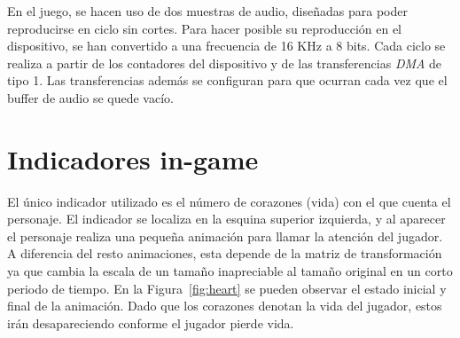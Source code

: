En el juego, se hacen uso de dos muestras de audio, diseñadas para poder reproducirse en ciclo sin cortes. Para hacer posible su reproducción en el dispositivo, se han convertido a una frecuencia de 16 KHz a 8 bits. Cada ciclo se realiza a partir de los contadores del dispositivo y de las transferencias \textit{DMA} de tipo 1. Las transferencias además se configuran para que ocurran cada vez que el buffer de audio se quede vacío.

\section{Indicadores in-game}
El único indicador utilizado es el número de corazones (vida) con el que cuenta el personaje. El indicador se localiza en la esquina superior izquierda, y al aparecer el personaje realiza una pequeña animación para llamar la atención del jugador. A diferencia del resto animaciones, esta depende de la matriz de transformación ya que cambia la escala de un tamaño inapreciable al tamaño original en un corto periodo de tiempo. En la Figura~\ref{fig:heart} se pueden observar el estado inicial y final de la animación. Dado que los corazones denotan la vida del jugador, estos irán desapareciendo conforme el jugador pierde vida.

